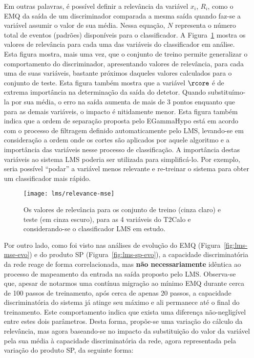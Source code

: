 Em outras palavras, é possível definir a relevância da variável $x_i$, $R_i$,
como o EMQ da saída de um discriminador comparada a mesma saída quando faz-se
a variável assumir o valor de sua média. Nessa equação, $N$ representa o
número total de eventos (padrões) disponíveis para o classificador. A
Figura~\ref{fig:relevance-mse} mostra os valores de relevância para cada uma
das variáveis do classificador em análise. Esta figura mostra, mais uma vez,
que o conjunto de treino permite generalizar o comportamento do discriminador,
apresentando valores de relevância, para cada uma de suas variáveis, bastante
próximos daqueles valores calculados para o conjunto de teste. Esta figura
também mostra que a variável $\rcore$ é de extrema importância na determinação
da saída do detetor. Quando substituímo-la por sua média, o erro na saída
aumenta de mais de 3 pontos enquanto que para as demais variáveis, o impacto é
nitidamente menor. Esta figura também indica que a ordem de separação proposta
pelo EGammaHypo está em acordo com o processo de filtragem definido
automaticamente pelo LMS, levando-se em consideração a ordem onde os cortes
são aplicados por aquele algoritmo e a importância das variáveis nesse
processo de classificação. A importância destas variáveis ao sistema LMS
poderia ser utilizada para simplificá-lo. Por exemplo, seria possível
``podar'' a variável menos relevante e re-treinar o sistema para obter um
classificador mais rápido.

\begin{figure}
\begin{center}
\texttt{[image: lms/relevance-mse]}
\end{center}
\caption{Os valores de relevância para os conjunto de treino (cinza claro) e
teste (em cinza escuro), para as 4 variáveis do T2Calo e considerando-se o
classificador LMS em estudo.}
\label{fig:relevance-mse}
\end{figure}

Por outro lado, como foi visto nas análises de evolução do EMQ
(Figura~\ref{fig:lms-mse-evo}) e do produto SP (Figura~\ref{fig:lms-sp-evo}),
a capacidade discriminatória da rede reage de forma correlacionada, mas
\textbf{não necessariamente} idêntica ao processo de mapeamento da entrada
na saída proposto pelo LMS. Observa-se que, apesar de notarmos uma contínua
migração ao mínimo EMQ durante cerca de 100 passos de treinamento, após cerca
de apenas 20 passos, a capacidade discriminatória do sistema já atinge seu
máximo e ali permanece até o final do treinamento. Este comportamento indica
que exista uma diferença não-negligível entre estes dois parâmetros. Desta
forma, propõe-se uma variação do cálculo da relevância, mas agora baseando-se
no impacto da substituição do valor da variável pela sua média à capacidade
discriminatória da rede, agora representada pela variação do produto SP, da
seguinte forma:

